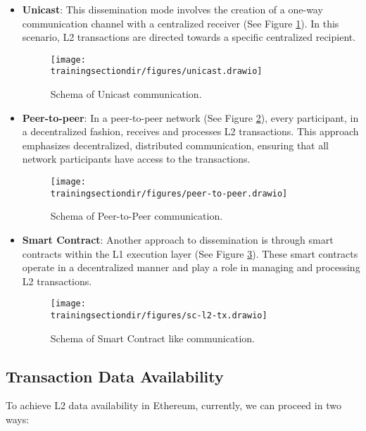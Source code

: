 \begin{itemize}

\item \textbf{Unicast}: This dissemination mode involves the creation of a one-way communication channel with a centralized receiver (See Figure \ref{fig:unicast-diss}). In this scenario, L2 transactions are directed towards a specific centralized recipient.

\begin{figure}[h]
\centering
\texttt{[image: \\trainingsectiondir/figures/unicast.drawio]}
\caption{Schema of Unicast communication.}
\label{fig:unicast-diss}
\end{figure}

\item \textbf{Peer-to-peer}: In a peer-to-peer network (See Figure \ref{fig:p2p-diss}), every participant, in a decentralized fashion, receives and processes L2 transactions. This approach emphasizes decentralized, distributed communication, ensuring that all network participants have access to the transactions.

\begin{figure}[h]
\centering
\texttt{[image: \\trainingsectiondir/figures/peer-to-peer.drawio]}
\caption{Schema of Peer-to-Peer communication.}
\label{fig:p2p-diss}
\end{figure}

\item \textbf{Smart Contract}: Another approach to dissemination is through smart contracts within the L1 execution layer (See Figure \ref{fig:sc-diss}). These smart contracts operate in a decentralized manner and play a role in managing and processing L2 transactions.

\begin{figure}[h]
\centering
\texttt{[image: \\trainingsectiondir/figures/sc-l2-tx.drawio]}
\caption{Schema of Smart Contract like communication.}
\label{fig:sc-diss}
\end{figure}

\end{itemize}

\subsection{Transaction Data Availability}

To achieve L2 data availability in Ethereum, currently, we can proceed in two
ways:

